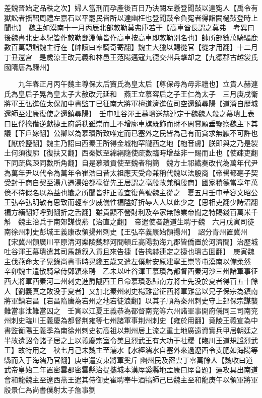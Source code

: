 差魏晉始定品秩之次】婦人當刑而孕產後百日乃決闕左懸登聞鼔以達寃人【禹令有獄訟者揺鞀周禮左嘉石以平罷民皆所以達幽枉也登聞鼓令負寃者得詣闕檛鼔登時上聞也】　魏主如漠南十一月丙辰北部敇勒莫弗庫若干【高車酋長謂之莫弗　考異曰後魏書北史本紀皆作敇勒鄧淵傳皆作高車按高車即敇勒别名也】帥所部數萬騎驅鹿數百萬頭詣魏主行在【帥讀曰率騎奇寄翻】魏主大獵以賜從官【從才用翻】十二月丁丑還宫　是歲涼王改元義和林邑王范陽邁寇九德交州兵擊却之【九德郡古越裳氏國隋唐為驩州】

　　九年春正月丙午魏主尊保太后竇氏為皇太后【尊保母為毋非禮也】立貴人赫連氏為皇后子晃為皇太子大赦改元延和　燕王立慕容后之子王仁為太子　三月庚戌衛將軍王弘進位太保加中書監丁巳征南大將軍檀道濟進位司空還鎮尋陽【道濟自歷城還師至建康復使之還鎮尋陽】　壬申吐谷渾王慕璝送赫連定于魏魏人殺之慕璝上表曰臣俘擒僭逆獻捷王府爵秩雖崇而土不增廓車旗既飾而財不周賞願垂鑒察魏主下其議【下戶嫁翻】公卿以為慕璝所致唯定而已塞外之民皆為己有而貪求無厭不可許也【厭於鹽翻】魏主乃詔曰西秦王所得金城枹罕隴西之地【枹音膚】朕即與之乃是裂土何須復廓【復扶又翻】西秦欵至綿絹隨使疏數臨時增益非一賜而止也【使疎吏翻下同疏與疎同數所角翻】自是慕璝貢使至魏者稍簡　魏方士祁纎奏改代為萬年代尹為萬年尹以代令為萬年令崔浩曰昔太祖應天受命兼稱代魏以法殷商【帝嚳都亳子契受封于商自契至湯八遷湯始都亳從先王居謂之亳殷故兼稱殷商】國家積德當享年萬億不待假名以為益也纎之所聞皆非正義宜復舊號魏主從之　夏五月壬申華容文昭公王弘卒弘明敏有思致而輕率少威儀性褊隘好折辱人人以此少之【思相吏翻少詩沼翻褊方緬翻好呼到翻折之舌翻】雖貴顯不營財利及卒家無餘業帝聞之特賜錢百萬米千斛　魏主治兵于南郊謀伐燕【治直之翻】　帝遣使者趙道生聘于魏　六月戊寅司徒南徐州刺史彭城王義康改領揚州刺史【王弘卒義康始領揚州】　詔分青州置冀州【宋冀州領廣川平原清河樂陵魏郡河間頓丘高陽勃海九郡皆僑置於河濟間】治歷城　吐谷渾王慕璝遣其司馬趙叙入貢且來告捷【告擒赫連定之捷也璝古囬翻】　庚寅魏主伐燕命太子晃錄尚書事時晃纔五歲又遣左僕射安原建寧王崇等屯漠南以備柔然　辛卯魏主遣散騎常侍鄧穎來聘　乙未以吐谷渾王慕璝為都督西秦河沙三州諸軍事征西大將軍西秦河二州刺史進爵隴西王且命慕璝悉歸南方將士先没於夏者得百五十餘人【劉義真之敗没于夏者】又加北秦州刺史楊難當征西將軍難當以兄子保宗為鎮南將軍鎮宕昌【宕昌隋唐為宕州之地宕徒浪翻】以其子順為秦州刺史守上邽保宗謀襲難當事泄難當囚之　壬寅以江夏王義恭為都督南兖等六州諸軍事開府儀同三司南兖州刺史臨川王義慶為都督荆雍等七州諸軍事荆州刺史【雍於用翻】竟陵王義宣為中書監衡陽王義季為南徐州刺史初高祖以荆州居上流之重土地廣遠資實兵甲居朝廷之半故遺詔令諸子居之上以義慶宗室令美且烈武王有大功于社稷【臨川王道規諡烈武王】故特用之　秋七月己未魏主至濡水【水經濡水自塞外來過遼西令支肥如海陽等縣而入于海濡乃官翻】庚申遣安東將軍奚斤幽州民及密雲丁零萬餘人【魏收曰道武帝皇始二年置密雲郡密雲縣治提攜城本漢厗奚縣地孟康曰厗音題】運攻具出南道會和龍魏主至遼西燕王遣其侍御史崔聘奉牛酒犒師己巳魏主至和龍庚午以領軍將軍殷景仁為尚書僕射太子詹事劉


